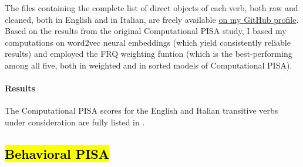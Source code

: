 The files containing the complete list of direct objects of each verb, both raw and cleaned, both in English and in Italian, are freely available \href{https://github.com/giuliacappelli/dissertationData}{on my GitHub profile}.\\
Based on the results from the original Computational PISA study, I based my computations on word2vec neural embeddings (which yield consistently reliable results) and employed the FRQ weighting funtion (which is the best-performing among all five, both in weighted and in sorted models of Computational PISA).

\paragraph{Results}
The Computational PISA scores for the English and Italian transitive verbs under consideration are fully listed in .\\ %


\subsection{\hl{Behavioral PISA}}

